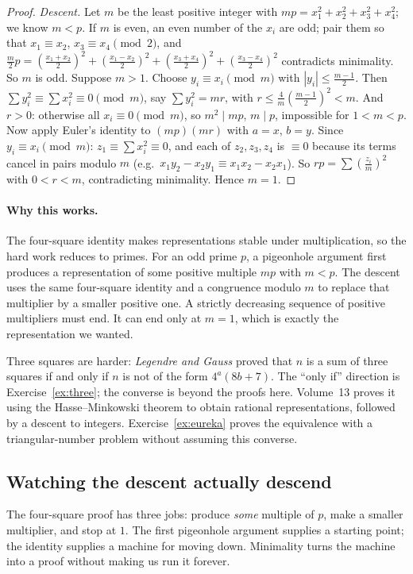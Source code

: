 \begin{proof}
\emph{Descent.} Let $m$ be the least positive integer with $mp=x_1^2+x_2^2+x_3^2+x_4^2$; we know $m<p$. If $m$ is even, an even number of the $x_i$ are odd; pair them so that $x_1\equiv x_2$, $x_3\equiv x_4\pmod2$, and $\frac m2p=\left(\frac{x_1+x_2}2\right)^2+\left(\frac{x_1-x_2}2\right)^2+\left(\frac{x_3+x_4}2\right)^2+\left(\frac{x_3-x_4}2\right)^2$ contradicts minimality. So $m$ is odd. Suppose $m>1$. Choose $y_i\equiv x_i\pmod m$ with $|y_i|\le\frac{m-1}2$. Then $\sum y_i^2\equiv\sum x_i^2\equiv0\pmod m$, say $\sum y_i^2=mr$, with $r\le\frac{4}{m}\left(\frac{m-1}2\right)^2<m$. And $r>0$: otherwise all $x_i\equiv0\pmod m$, so $m^2\mid mp$, $m\mid p$, impossible for $1<m<p$.
Now apply Euler's identity to $(mp)(mr)$ with $a=x$, $b=y$. Since $y_i\equiv x_i\pmod m$: $z_1\equiv\sum x_i^2\equiv0$, and each of $z_2,z_3,z_4$ is $\equiv0$ because its terms cancel in pairs modulo $m$ (e.g.\ $x_1y_2-x_2y_1\equiv x_1x_2-x_2x_1$). So $rp=\sum\left(\frac{z_i}m\right)^2$ with $0<r<m$, contradicting minimality. Hence $m=1$.
\end{proof}

\paragraph{Why this works.}
The four-square identity makes representations stable under multiplication, so the hard work reduces to primes. For an odd prime $p$, a pigeonhole argument first produces a representation of some positive multiple $mp$ with $m<p$. The descent uses the same four-square identity and a congruence modulo $m$ to replace that multiplier by a smaller positive one. A strictly decreasing sequence of positive multipliers must end. It can end only at $m=1$, which is exactly the representation we wanted.

\begin{remark}
Three squares are harder: \emph{Legendre and Gauss} proved that $n$ is a sum of three squares if and only if $n$ is not of the form $4^a(8b+7)$. The ``only if'' direction is Exercise~\ref{ex:three}; the converse is beyond the proofs here. Volume~13 proves it using the Hasse--Minkowski theorem to obtain rational representations, followed by a descent to integers. Exercise~\ref{ex:eureka} proves the equivalence with a triangular-number problem without assuming this converse.
\end{remark}

\subsection*{Watching the descent actually descend}
The four-square proof has three jobs: produce \emph{some} multiple of $p$, make a smaller multiplier, and stop at $1$. The first pigeonhole argument supplies a starting point; the identity supplies a machine for moving down. Minimality turns the machine into a proof without making us run it forever.


